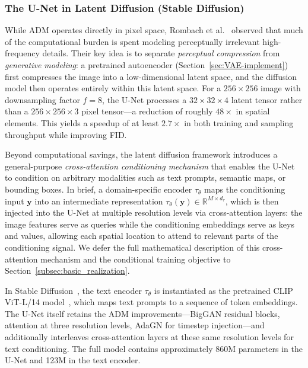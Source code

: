 \documentclass[../../book-main.tex]{subfiles}
\begin{document}
\subsubsection{The U-Net in Latent Diffusion (Stable Diffusion)}
\label{sec:unet-ldm}

While ADM operates directly in pixel space, Rombach et
al.~\citep{rombach2022high} observed that much of the computational
burden is spent modeling perceptually irrelevant high-frequency
details. Their key idea is to separate \emph{perceptual compression}
from \emph{generative modeling}: a pretrained autoencoder
(Section~\ref{sec:VAE-implement}) first compresses the image into a
low-dimensional latent space, and the diffusion model then operates
entirely within this latent space. For a $256 \times 256$ image with
downsampling factor $f = 8$, the U-Net processes a $32 \times 32
\times 4$ latent tensor rather than a $256 \times 256 \times 3$ pixel
tensor---a reduction of roughly $48\times$ in spatial elements. This
yields a speedup of at least $2.7\times$ in both training and
sampling throughput while improving FID.

Beyond computational savings, the latent diffusion framework
introduces a general-purpose \emph{cross-attention conditioning
mechanism} that enables the U-Net to condition on arbitrary
modalities such as text prompts, semantic maps, or bounding boxes. In
brief, a domain-specific encoder $\tau_\theta$ maps the conditioning
input $\boldsymbol{y}$ into an intermediate representation
$\tau_\theta(\boldsymbol{y}) \in \mathbb{R}^{M \times d_\tau}$, which
is then injected into the U-Net at multiple resolution levels via
cross-attention layers: the image features serve as queries while the
conditioning embeddings serve as keys and values, allowing each
spatial location to attend to relevant parts of the conditioning
signal. We defer the full mathematical description of this
cross-attention mechanism and the conditional training objective to
Section~\ref{subsec:basic_realization}.

In Stable Diffusion~\citep{rombach2022high}, the text encoder
$\tau_\theta$ is instantiated as the pretrained CLIP ViT-L/14
model~\citep{radford2021learning}, which maps text prompts to a
sequence of token embeddings. The U-Net itself retains the ADM
improvements---BigGAN residual blocks, attention at three resolution
levels, AdaGN for timestep injection---and additionally interleaves
cross-attention layers at these same resolution levels for text
conditioning. The full model contains approximately 860M parameters
in the U-Net and 123M in the text encoder.
\end{document}
